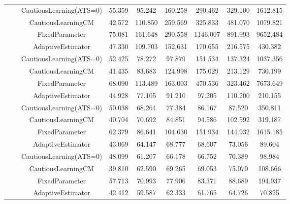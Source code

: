 \begin{table}[!h]
\begin{tabular}[t]{ccccccccc}
 &  & CautiousLearning(ATS=0) & 55.359 & 95.242 & 160.258 & 290.462 & 329.100 & 1612.815\\

 &  & CautiousLearningCM & 42.572 & 110.850 & 259.569 & 325.833 & 481.070 & 1079.821\\

 & \multirow[t]{-4}{*}{\centering\arraybackslash 0.25} & FixedParameter & 75.081 & 161.648 & 290.558 & 1146.007 & 891.993 & 9652.484\\
\cmidrule{2-9}
 &  & AdaptiveEstimator & 47.330 & 109.703 & 152.631 & 170.655 & 216.575 & 430.382\\

 &  & CautiousLearning(ATS=0) & 52.425 & 78.272 & 97.879 & 151.534 & 137.324 & 1037.356\\

 &  & CautiousLearningCM & 41.435 & 83.683 & 124.998 & 175.029 & 213.129 & 730.199\\

 & \multirow[t]{-4}{*}{\centering\arraybackslash 0.35} & FixedParameter & 68.090 & 113.489 & 163.003 & 470.536 & 323.462 & 7673.649\\
\cmidrule{2-9}
 &  & AdaptiveEstimator & 44.928 & 77.105 & 91.210 & 97.205 & 110.200 & 210.155\\

 &  & CautiousLearning(ATS=0) & 50.038 & 68.264 & 77.384 & 86.167 & 87.520 & 350.811\\

 &  & CautiousLearningCM & 40.704 & 70.692 & 84.851 & 94.586 & 102.592 & 319.187\\

 & \multirow[t]{-4}{*}{\centering\arraybackslash 0.50} & FixedParameter & 62.379 & 86.641 & 104.630 & 151.934 & 144.932 & 1615.185\\
\cmidrule{2-9}
 &  & AdaptiveEstimator & 43.069 & 64.147 & 68.777 & 68.607 & 73.056 & 89.604\\

 &  & CautiousLearning(ATS=0) & 48.099 & 61.207 & 66.178 & 66.752 & 70.389 & 98.984\\

 &  & CautiousLearningCM & 39.810 & 62.590 & 69.265 & 69.053 & 75.070 & 108.666\\

 & \multirow[t]{-4}{*}{\centering\arraybackslash 0.75} & FixedParameter & 57.713 & 70.993 & 77.906 & 83.371 & 88.689 & 194.937\\
\cmidrule{2-9}
 &  & AdaptiveEstimator & 42.412 & 59.587 & 62.333 & 61.765 & 64.726 & 70.825\\


\end{tabular}
\end{table}
